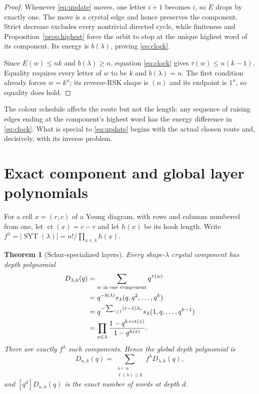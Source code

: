 \documentclass[a4paper,10pt]{amsart}
\newtheorem{theorem}{Theorem}[section]
\theoremstyle{remark}
\newcommand{\SYT}{\operatorname{SYT}}
\begin{document}
\begin{proof}
Whenever \eqref{eq:update} moves, one letter $i+1$ becomes $i$, so $E$
drops by exactly one.  The move is a crystal edge and hence preserves the
component.  Strict decrease excludes every nontrivial directed cycle, while
finiteness and Proposition~\ref{prop:highest} force the orbit to stop at the
unique highest word of its component.  Its energy is $b(\lambda)$, proving
\eqref{eq:clock}.

Since $E(w)\leq nk$ and $b(\lambda)\geq n$, equation \eqref{eq:clock} gives
$\tau(w)\leq n(k-1)$.  Equality requires every letter of $w$ to be $k$ and
$b(\lambda)=n$.  The first condition already forces $w=k^n$; its
reverse-RSK shape is $(n)$ and its endpoint is $1^n$, so equality does hold.
\end{proof}

The colour schedule affects the route but not the length: any sequence of
raising edges ending at the component's highest word has the energy
difference in \eqref{eq:clock}.  What is special to \eqref{eq:update} begins
with the actual chosen route and, decisively, with its inverse problem.

\section{Exact component and global layer polynomials}

For a cell $x=(r,c)$ of a Young diagram, with rows and columns numbered from
one, let $\operatorname{ct}(x)=c-r$ and let $h(x)$ be its hook length.  Write
$f^\lambda=|\SYT(\lambda)|=n!/\prod_{x\in\lambda}h(x)$.

\begin{theorem}[Schur-specialized layers]\label{thm:layers}
Every shape-$\lambda$ crystal component has depth polynomial
\begin{align}
 D_{\lambda,k}(q)
  &=\sum_{w\text{ in one component}}q^{\tau(w)}\label{eq:component-poly}\\
  &=q^{-b(\lambda)}s_\lambda(q,q^2,\ldots,q^k)\notag\\
  &=q^{-\sum_{r\geq1}(r-1)\lambda_r}
       s_\lambda(1,q,\ldots,q^{k-1})\notag\\
  &=\prod_{x\in\lambda}
       \frac{1-q^{k+\operatorname{ct}(x)}}{1-q^{h(x)}}.\notag
\end{align}
There are exactly $f^\lambda$ such components.  Hence the global depth
polynomial is
\begin{equation}\label{eq:global-poly}
 D_{n,k}(q)=\sum_{\substack{\lambda\vdash n\\\ell(\lambda)\leq k}}
 f^\lambda D_{\lambda,k}(q),
\end{equation}
and $[q^d]D_{n,k}(q)$ is the exact number of words at depth $d$.
\end{theorem}
\end{document}
